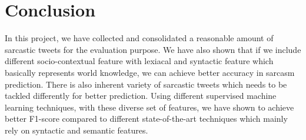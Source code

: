 \section{Conclusion}
\label{sec:conclusion}
In this project, we have collected and consolidated a reasonable amount of sarcastic tweets for the evaluation purpose. We have also shown that if we include different socio-contextual feature with lexiacal and syntactic feature which basically represents world knowledge, we can achieve better accuracy in sarcasm prediction. There is also inherent variety of sarcastic tweets which needs to be tackled differently for better prediction. Using different supervised machine learning techniques, with these diverse set of features, we have shown to achieve better F1-score compared to different state-of-the-art techniques which mainly rely on syntactic and semantic features.